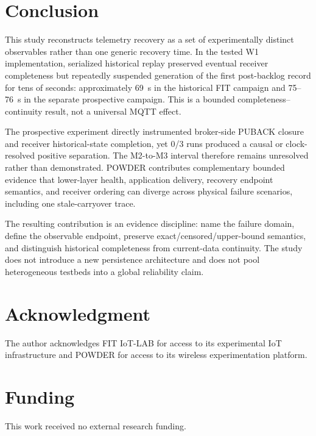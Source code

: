 \documentclass[journal]{IEEEtran}
\begin{document}
\section{Conclusion}
\label{sec:conclusion}

This study reconstructs telemetry recovery as a set of experimentally distinct observables rather than one generic recovery time. In the tested W1 implementation, serialized historical replay preserved eventual receiver completeness but repeatedly suspended generation of the first post-backlog record for tens of seconds: approximately 69~s in the historical FIT campaign and 75--76~s in the separate prospective campaign. This is a bounded completeness--continuity result, not a universal MQTT effect.

The prospective experiment directly instrumented broker-side PUBACK closure and receiver historical-state completion, yet 0/3 runs produced a causal or clock-resolved positive separation. The M2-to-M3 interval therefore remains unresolved rather than demonstrated. POWDER contributes complementary bounded evidence that lower-layer health, application delivery, recovery endpoint semantics, and receiver ordering can diverge across physical failure scenarios, including one stale-carryover trace.

The resulting contribution is an evidence discipline: name the failure domain, define the observable endpoint, preserve exact/censored/upper-bound semantics, and distinguish historical completeness from current-data continuity. The study does not introduce a new persistence architecture and does not pool heterogeneous testbeds into a global reliability claim.

\section*{Acknowledgment}
The author acknowledges FIT IoT-LAB for access to its experimental IoT infrastructure and POWDER for access to its wireless experimentation platform.

\section*{Funding}
This work received no external research funding.
\end{document}
